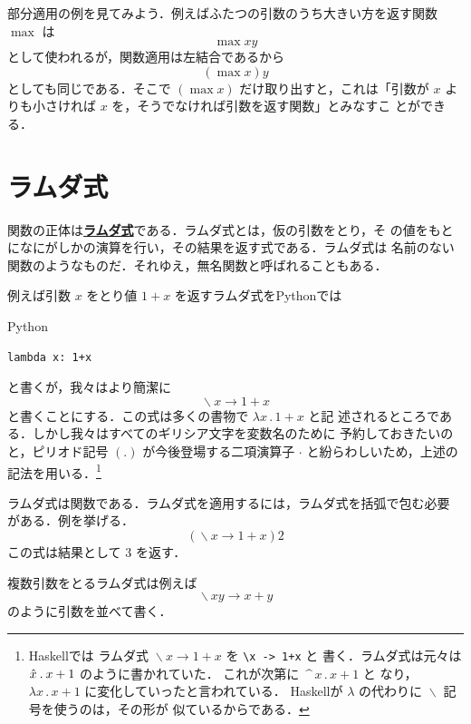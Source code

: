 \documentclass[a5paper,twoside,fleqn,draft]{jsbook}
\newcommand{\programminglanguage}[1]{\textsf{#1}}
\newcommand{\haskell}{\programminglanguage{Haskell}}
\newcommand{\python}{\programminglanguage{Python}}
\newcommand{\keyword}[1]{{\underline{\textbf{#1}}}}
\newcommand{\code}[1]{\texttt{#1}}
\newenvironment{pythoncode}{\begin{itembox}[r]{\python}}{\end{itembox}}
\newcommand{\mSpecialFunc}[1]{\mathrm{#1}}
\DeclareMathOperator{\mMax}{\mSpecialFunc{max}}
\DeclareMathOperator{\mLambda}{\backslash}
\DeclareMathOperator{\mLambdaArrow}{\rightarrow}
\newcommand{\mLambdaExp}[2]{\mLambda{#1}\mLambdaArrow{#2}}
\begin{document}
部分適用の例を見てみよう．例えばふたつの引数のうち大きい方を返す関数
$\mMax$ は
\begin{equation}
  \mMax xy
\end{equation}
として使われるが，関数適用は左結合であるから
\begin{equation}
  (\mMax x)y
\end{equation}
としても同じである．そこで $(\mMax x)$ だけ取り出すと，これは「引数が
  $x$ よりも小さければ $x$ を，そうでなければ引数を返す関数」とみなすこ
とができる．

\section{ラムダ式}

関数の正体は\keyword{ラムダ式}である．ラムダ式とは，仮の引数をとり，そ
の値をもとになにがしかの演算を行い，その結果を返す式である．ラムダ式は
名前のない関数のようなものだ．それゆえ，無名関数と呼ばれることもある．

例えば引数 $x$ をとり値 $1+x$ を返すラムダ式を\python では
\begin{pythoncode}
\begin{verbatim}
lambda x: 1+x
\end{verbatim}
\end{pythoncode}
と書くが，我々はより簡潔に
\begin{equation}
  \mLambdaExp{x}{1+x}
\end{equation}
と書くことにする．この式は多くの書物で $\lambda x\mathbin{.}1+x$ と記
述されるところである．しかし我々はすべてのギリシア文字を変数名のために
予約しておきたいのと，ピリオド記号 $(.)$ が今後登場する二項演算子
$\cdot$ と紛らわしいため，上述の記法を用いる．\footnote{\haskell では
ラムダ式 $\mLambdaExp{x}{1+x}$ を \code{\textbackslash x -> 1+x} と
書く．ラムダ式は元々は $\Hat x\mathbin{.}x+1$ のように書かれていた．
これが次第に $\mathop{\texttt{\textasciicircum}}x\mathbin{.}x+1$ と
なり，$\lambda x\mathbin{.}x+1$ に変化していったと言われている．
\haskell が $\lambda$ の代わりに $\mLambda$ 記号を使うのは，その形が
似ているからである．}

ラムダ式は関数である．ラムダ式を適用するには，ラムダ式を括弧で包む必要
がある．例を挙げる．
\begin{equation}
  (\mLambdaExp{x}{1+x})2
\end{equation}
この式は結果として $3$ を返す．

複数引数をとるラムダ式は例えば
\begin{equation}
  \mLambdaExp{xy}{x+y}
\end{equation}
のように引数を並べて書く．
\end{document}
